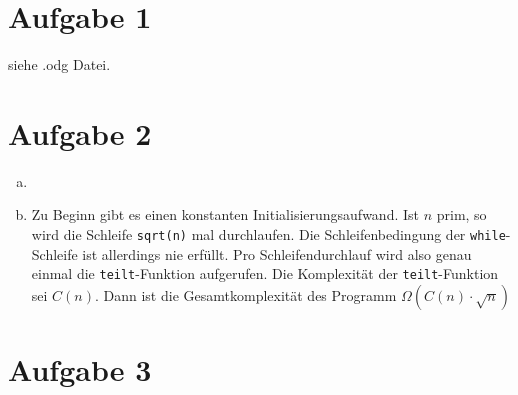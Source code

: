 \documentclass{article}
\begin{document}
	\section*{Aufgabe 1}
	siehe .odg Datei.
	\section*{Aufgabe 2}
	\begin{enumerate}[(a)]
		\item 
		\item Zu Beginn gibt es einen konstanten Initialisierungsaufwand.
		Ist $n$ prim, so wird die Schleife \lstinline{sqrt(n)} mal durchlaufen.
		Die Schleifenbedingung der \lstinline{while}-Schleife ist allerdings nie erfüllt.
		Pro Schleifendurchlauf wird also genau einmal die \lstinline{teilt}-Funktion aufgerufen.
		Die Komplexität der \lstinline{teilt}-Funktion sei $C(n)$. 
		Dann ist die Gesamtkomplexität des Programm $\Omega(C(n)\cdot \sqrt{n})$
	\end{enumerate}
	\section*{Aufgabe 3}
	
\end{document}
